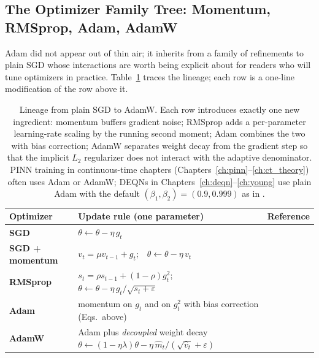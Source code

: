 \documentclass[11pt,a4paper]{report}
\begin{document}
\subsection{The Optimizer Family Tree: Momentum, RMSprop, Adam, AdamW}
\label{sec:optimizer_zoo}

Adam did not appear out of thin air; it inherits from a family of refinements to plain SGD whose interactions are worth being explicit about for readers who will tune optimizers in practice.  Table~\ref{tab:optimizer_family} traces the lineage; each row is a one-line modification of the row above it.

\begin{table}[ht]
\centering
\footnotesize
\setlength{\tabcolsep}{4pt}
\begin{tabular}{@{} >{\bfseries}p{2.4cm} p{8.4cm} p{3.2cm} @{}}
\toprule
\textbf{Optimizer} & \textbf{Update rule (one parameter)} & \textbf{Reference} \\
\midrule
SGD             & $\theta \leftarrow \theta - \eta\,g_t$                                                                                       & \citet{robbins1951stochastic} \\
SGD + momentum  & $v_t = \mu v_{t-1} + g_t$;\ \ $\theta \leftarrow \theta - \eta\,v_t$                                                         & \citet{sutskever2013importance} \\
RMSprop         & $s_t = \rho s_{t-1} + (1-\rho)g_t^2$;\ \ $\theta \leftarrow \theta - \eta\,g_t/\sqrt{s_t+\varepsilon}$                       & \citet{tieleman2012rmsprop} \\
Adam            & momentum on $g_t$ and on $g_t^2$ with bias correction (Eqs.\ above)                                                          & \citet{kingma2015adam} \\
AdamW           & Adam plus \emph{decoupled} weight decay $\theta \leftarrow (1-\eta\lambda)\theta - \eta\,\hat m_t/(\sqrt{\hat v_t}+\varepsilon)$ & \citet{loshchilov2019decoupled} \\
\bottomrule
\end{tabular}
\caption{Lineage from plain SGD to AdamW.  Each row introduces exactly one new ingredient: momentum buffers gradient noise; RMSprop adds a per-parameter learning-rate scaling by the running second moment; Adam combines the two with bias correction; AdamW separates weight decay from the gradient step so that the implicit $L_2$ regularizer does not interact with the adaptive denominator.  PINN training in continuous-time chapters (Chapters~\ref{ch:pinn}--\ref{ch:ct_theory}) often uses Adam or AdamW; DEQNs in Chapters~\ref{ch:deqn}--\ref{ch:young} use plain Adam with the default $(\beta_1,\beta_2)=(0.9, 0.999)$ as in \citet{azinovicDEEPEQUILIBRIUMNETS2022}.}
\label{tab:optimizer_family}
\end{table}
\end{document}
